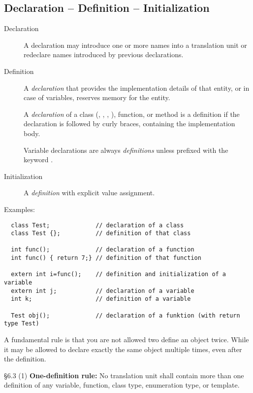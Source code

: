 \subsection{Declaration -- Definition -- Initialization}
\begin{description}
\item[Declaration] A declaration may introduce one or more names into a translation unit or redeclare names
  introduced by previous declarations.

\item[Definition] A \textit{declaration} that provides the implementation details of that entity, or in case of variables, reserves memory for
  the entity.

  A \textit{declaration} of a class (, , , ), function, or method is a definition if the declaration is
  followed by curly braces, containing the implementation body.

  Variable declarations are always \textit{definitions} unless prefixed with the keyword .

\item[Initialization] A \textit{definition} with explicit value assignment.
\end{description}

Examples:
\begin{verbatim}
  class Test;             // declaration of a class
  class Test {};          // definition of that class

  int func();             // declaration of a function
  int func() { return 7;} // definition of that function

  extern int i=func();    // definition and initialization of a variable
  extern int j;           // declaration of a variable
  int k;                  // definition of a variable

  Test obj();             // declaration of a funktion (with return type Test)
\end{verbatim}

A fundamental rule is that you are not allowed two define an object twice. While it may be allowed to declare exactly the same object multiple times, even after the definition.

\begin{standard}{\S 6.3 (1)}
  \textbf{One-definition rule:} No translation unit shall contain more than one definition of any variable, function, class type, enumeration
  type, or template.
\end{standard}

